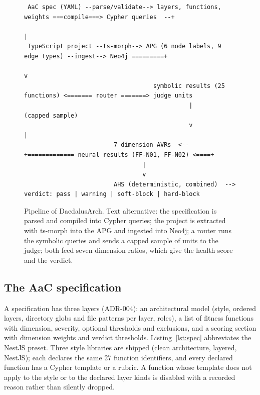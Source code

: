 \documentclass[10pt,a4paper]{article}
\newcommand{\tool}{DaedalusArch}
\begin{document}
\begin{figure}[t]
\centering
\footnotesize
\begin{verbatim}
 AaC spec (YAML) --parse/validate--> layers, functions, weights ===compile===> Cypher queries  --+
                                                                                               |
 TypeScript project --ts-morph--> APG (6 node labels, 9 edge types) --ingest--> Neo4j =========+
                                                                                               v
                                    symbolic results (25 functions) <======= router =======> judge units
                                              |                                               (capped sample)
                                              v                                                   |
                         7 dimension AVRs  <--+============= neural results (FF-N01, FF-N02) <====+
                                 |
                                 v
                         AHS (deterministic, combined)  -->  verdict: pass | warning | soft-block | hard-block
\end{verbatim}
\caption{Pipeline of \tool{}. Text alternative: the specification is parsed and compiled into Cypher queries; the
project is extracted with ts-morph into the APG and ingested into Neo4j; a router runs the symbolic queries and
sends a capped sample of units to the judge; both feed seven dimension ratios, which give the health score and the
verdict.}
\label{fig:pipeline}
\end{figure}

\subsection{The AaC specification}\label{sec:spec}

A specification has three layers (ADR-004): an architectural model (style, ordered layers, directory globs and file
patterns per layer, roles), a list of fitness functions with dimension, severity, optional thresholds and exclusions,
and a scoring section with dimension weights and verdict thresholds. Listing~\ref{lst:spec} abbreviates the NestJS
preset. Three style libraries are shipped (clean architecture, layered, NestJS); each declares the same 27 function
identifiers, and every declared function has a Cypher template or a rubric. %
A function whose template does not apply to the style or to the declared layer kinds is disabled with a recorded
reason rather than silently dropped.
\end{document}

